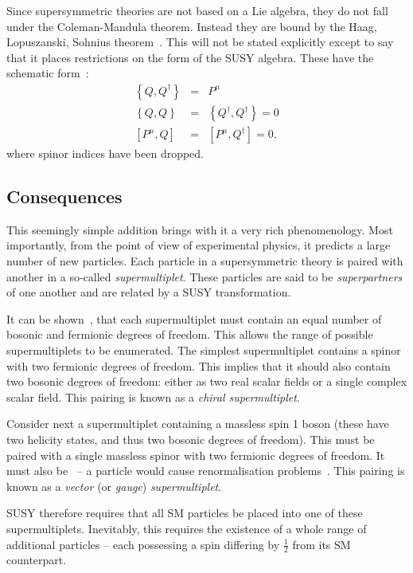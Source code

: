 Since supersymmetric theories are not based on a Lie algebra, they do not fall
under the Coleman-Mandula theorem. Instead they are bound by the Haag,
Lopuszanski, Sohnius theorem~\cite{hls_theorem}. This will not be stated explicitly except to say
that it places restrictions on the form of the \ac{SUSY} algebra. These have the
schematic form~\cite{susy_primer}:
\begin{eqnarray}
\left\{Q,Q^{\dagger}\right\} &=& P^{\mu}\nonumber\\
\left\{Q,Q\right\} &=& \left\{Q^{\dagger}, Q^{\dagger}\right\} = 0\nonumber\\
\left[P^{\mu}, Q\right] &=& \left[P^{\mu}, Q^{\dagger}\right] = 0,\label{eqn:susy_commutator}
\end{eqnarray}
where spinor indices have been dropped.

\subsection{Consequences}
\label{sec:consequences}
This seemingly simple addition brings with it a very rich phenomenology. Most
importantly, from the point of view of experimental physics, it predicts a large
number of new particles. Each particle in a supersymmetric theory is paired with
another in a so-called \emph{supermultiplet}. These particles are said to be
\emph{superpartners} of one another and are related by a \ac{SUSY}
transformation.

It can be shown~\cite{susy_primer}, that each supermultiplet must contain an
equal number of bosonic and fermionic degrees of freedom. This allows the range
of possible supermultiplets to be enumerated. The simplest supermultiplet
contains a spinor with two fermionic degrees of freedom. This implies that it
should also contain two bosonic degrees of freedom: either as two real scalar
fields or a single complex scalar field. This pairing is known as a \emph{chiral
  supermultiplet}.

Consider next a supermultiplet containing a massless spin 1 boson
(these have two helicity states, and thus two bosonic degrees of
freedom). This must be paired with a single massless spinor with two
fermionic degrees of freedom. It must also be \spinhalf\ -- a
\spinthreetwo particle would cause renormalisation problems~\cite{susy_primer}. This
pairing is known as a \emph{vector} (or \emph{gauge})
\emph{supermultiplet}.

\ac{SUSY} therefore requires that all \ac{SM} particles be placed into one
of these supermultiplets. Inevitably, this requires the existence of a whole
range of additional particles -- each possessing a spin differing by
$\frac{1}{2}$ from its \ac{SM} counterpart.

